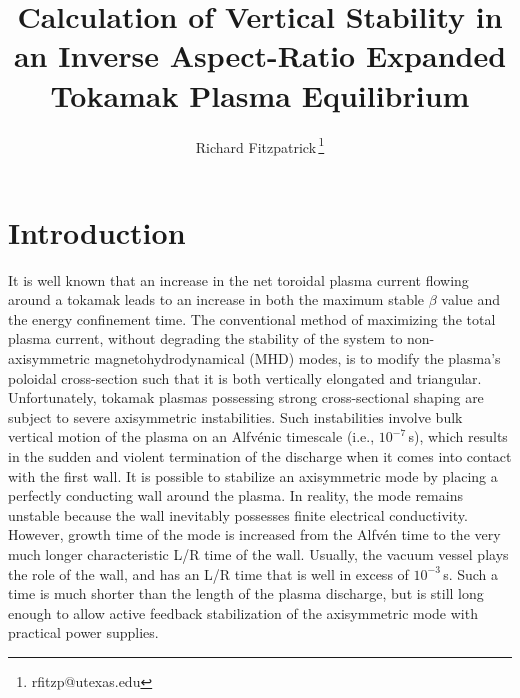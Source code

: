 \documentclass[12pt,prb,aps]{revtex4-1}
\begin{document}
\title{Calculation of Vertical Stability in an Inverse Aspect-Ratio Expanded Tokamak Plasma Equilibrium}
\author{Richard Fitzpatrick\,\footnote{rfitzp@utexas.edu}}
\maketitle

\section{Introduction}
It is well known that an increase in  the net toroidal plasma current flowing around a tokamak  leads to an increase in both the maximum stable $\beta$ value and the energy confinement time.\cite{troyon,goldston}
The conventional method of maximizing the total plasma current, without degrading the  stability of the system to non-axisymmetric magnetohydrodynamical (MHD) modes, is
to modify the plasma's poloidal cross-section such that it is both vertically elongated and triangular.\cite{jet}  Unfortunately, tokamak plasmas possessing strong cross-sectional shaping
are subject to severe axisymmetric instabilities.\cite{v1,v2} Such instabilities involve bulk vertical motion of the plasma on an Alfv\'{e}nic timescale (i.e., $10^{-7}$\,s), which results in the
sudden and violent termination of the  discharge when it comes into contact with the first wall. It is possible to stabilize an axisymmetric mode by placing a perfectly conducting wall
around the plasma. In reality, the mode remains unstable because  the wall inevitably possesses finite electrical conductivity.\cite{rwm}  However, 
growth time of the mode is increased from the Alfv\'{e}n time to the very much longer characteristic L/R time of the wall.\cite{rwm1,rwm1a,rwm2} Usually, the vacuum vessel plays the role of the wall,
and has an L/R time that is  well in excess of  $10^{-3}$\,s. Such a time is much shorter than the length of the plasma 
discharge, but is still long enough to allow active feedback stabilization of the axisymmetric mode with practical power supplies.\cite{rwm3} 
\end{document}
